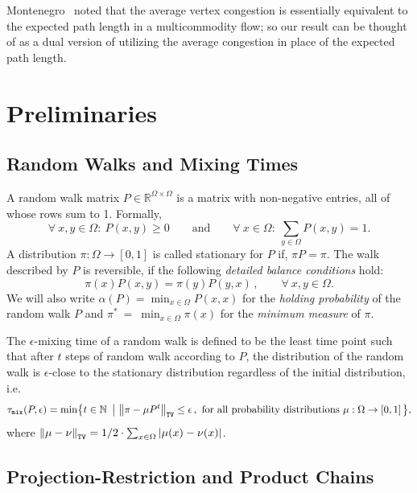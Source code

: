 \documentclass[a4paper, 12p]{article}
\numberwithin{equation}{section}
\DeclarePairedDelimiter\set{\lbrace}{\rbrace}
\DeclarePairedDelimiter\norm{\|}{\|}
\def\Tmix{\tau_{\mathtt{mix}}}
\def\TV{\mathtt{TV}}
\begin{document}
Montenegro~\cite{montenegrovc} noted that the average vertex congestion is essentially equivalent to the expected path length in a multicommodity flow; so our result can be thought of as a dual version of \cite{weimingjs} utilizing the average congestion in place of the expected path length.

\section{Preliminaries}\label{sec:prelim}
\subsection{Random Walks and Mixing Times}
\label{sec:mcmc}
A random walk matrix $P \in \mathbb R^{\Omega \times \Omega}$ is a matrix with non-negative entries, all of whose rows sum to 1. Formally,
\[ \forall~x, y \in \Omega:~ P(x, y) \ge 0 \qquad \textrm{and}\qquad \forall~ x \in \Omega:~ \sum_{y \in \Omega} P(x, y) = 1.\]
A distribution $\pi: \Omega \to [0, 1]$ is called stationary for $P$ if, $\pi P = \pi$. The walk described by $P$ is reversible, if the following \emph{detailed balance conditions} hold:
\[ \pi(x) P(x, y) = \pi(y) P(y, x)\,,\quad\quad\forall~x, y \in \Omega.\]
We will also write $\alpha(P) = \min_{x \in \Omega} P(x, x)$ for the \emph{holding probability} of the random walk $P$ and $\pi^*~=~\min_{x \in \Omega} \pi(x)$ for the \emph{minimum measure} of $\pi$.

The $\epsilon$-mixing time of a random walk is defined to be the least time point such that after $t$ steps of random walk according to $P$, the distribution of the random walk is $\epsilon$-close to the stationary distribution regardless of the initial distribution, i.e.~
\[ \Tmix(P, \epsilon) = \min\set*{  t \in \mathbb N  ~\left|~\norm*{ \pi - \mu P^t}_{\TV} \le \epsilon\,,~\textrm{for all probability distributions}~\mu: \Omega \to [0,1]\right.}, \]
where $\norm*{\mu - \nu}_{\TV} = 1/2 \cdot \sum_{x \in \Omega} |\mu(x) - \nu(x)|$.

\subsection{Projection-Restriction and Product Chains}
\end{document}
